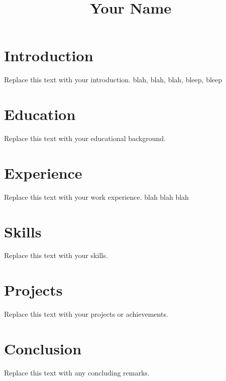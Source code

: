 \documentclass{article}
\begin{document}
\title{Your Name}
\author{}
\date{}

\maketitle

\section{Introduction}
Replace this text with your introduction. blah, blah, blah, bleep, bleep

\section{Education}
Replace this text with your educational background.

\section{Experience}
Replace this text with your work experience. blah blah blah

\section{Skills}
Replace this text with your skills.

\section{Projects}
Replace this text with your projects or achievements.

\section{Conclusion}
Replace this text with any concluding remarks.
\end{document}
